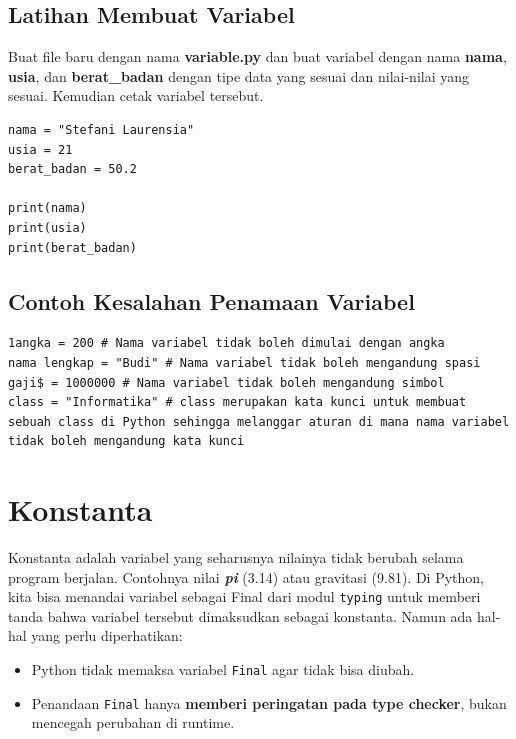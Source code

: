 \subsection{Latihan Membuat Variabel}

Buat file baru dengan nama \textbf{variable.py} dan buat variabel dengan nama \textbf{nama}, \textbf{usia}, dan \textbf{berat_badan} dengan tipe data yang sesuai dan nilai-nilai yang sesuai. Kemudian cetak variabel tersebut.

\begin{lstlisting}[style=PythonStyle, caption={Kode Python: variable.py}]
nama = "Stefani Laurensia"
usia = 21
berat_badan = 50.2

print(nama)
print(usia)
print(berat_badan)
\end{lstlisting}

\subsection{Contoh Kesalahan Penamaan Variabel}

\begin{lstlisting}[style=PythonStyle, caption={Kode Python: variable.py}]
1angka = 200 # Nama variabel tidak boleh dimulai dengan angka
nama lengkap = "Budi" # Nama variabel tidak boleh mengandung spasi
gaji$ = 1000000 # Nama variabel tidak boleh mengandung simbol
class = "Informatika" # class merupakan kata kunci untuk membuat sebuah class di Python sehingga melanggar aturan di mana nama variabel tidak boleh mengandung kata kunci
\end{lstlisting}

\section{Konstanta}

Konstanta adalah variabel yang seharusnya nilainya tidak berubah selama program berjalan. Contohnya nilai \textbf{\textit{pi}} (3.14) atau gravitasi (9.81). Di Python, kita bisa menandai variabel sebagai Final dari modul \texttt{typing} untuk memberi tanda bahwa variabel tersebut dimaksudkan sebagai konstanta. Namun ada hal-hal yang perlu diperhatikan:
\begin{itemize}
	\item Python tidak memaksa variabel \texttt{Final} agar tidak bisa diubah.
	\item Penandaan \texttt{Final} hanya \textbf{memberi peringatan pada type checker}, bukan mencegah perubahan di runtime.
\end{itemize}

